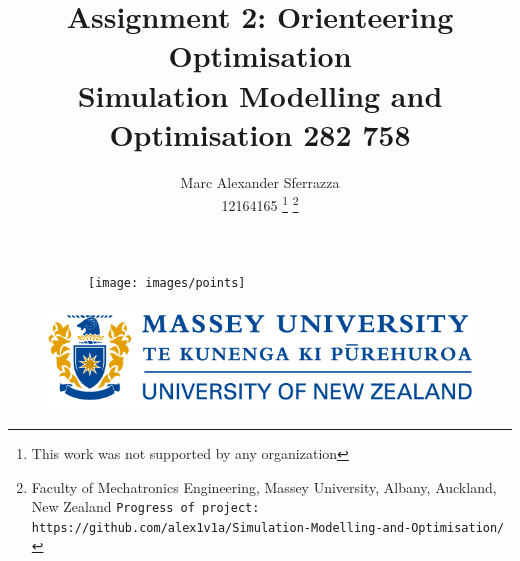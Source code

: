 \documentclass[a4paper, 10pt]{IEEEconf}
\title{\LARGE \bf Assignment 2: Orienteering Optimisation\\Simulation Modelling and Optimisation 282 758}
\author{Marc Alexander Sferrazza \\ 12164165
\thanks{This work was not supported by any organization}
\thanks{Faculty of Mechatronics Engineering, Massey University, Albany, Auckland, New Zealand
        {\tt\small Progress of project: https://github.com/alex1v1a/Simulation-Modelling-and-Optimisation/} } }
\begin{document}
\maketitle
\begin{figure}[h]
\begin{subfigure}{\textwidth}
\texttt{[image: images/points]} 
\label{fig:Gazebo}
\end{subfigure}
\end{figure}
\begin{figure}[H]
  \begin{center}
  \includegraphics[width=\textwidth]{images/masseyUniversity}
  \label{fig:kinetic}
  \end{center}
\end{figure}
\thispagestyle{empty}
\pagestyle{plain}







\clearpage
\thispagestyle{empty}
\tableofcontents
\begingroup
\let\clearpage\relax
\listoffigures
\endgroup
\clearpage
\twocolumn

\clearpage
\setcounter{page}{1}
\onecolumn
\end{document}
